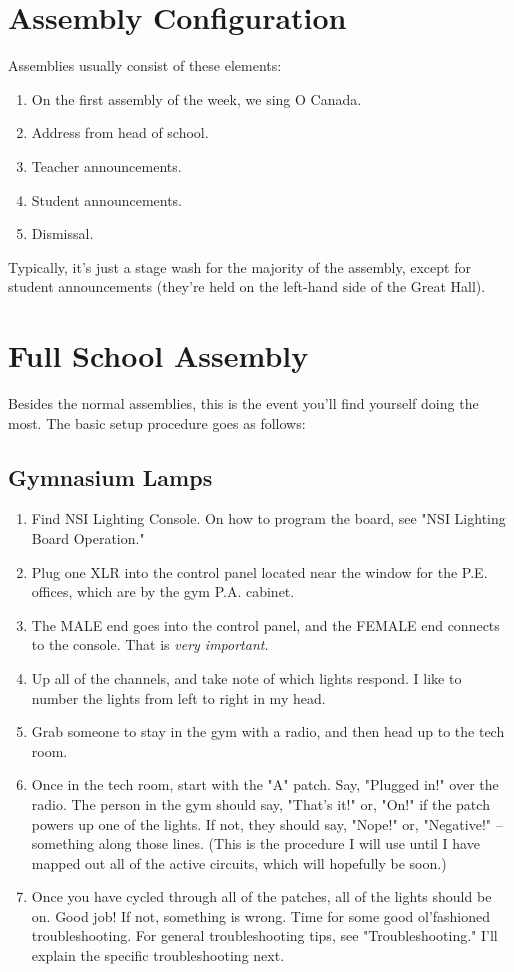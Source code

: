 \documentclass[letterpaper,10pt,oneside,headsepline]{scrreprt}
\begin{document}
\section{Assembly Configuration}
Assemblies usually consist of these elements:
\begin{enumerate}
\item On the first assembly of the week, we sing O Canada.
\item Address from head of school.
\item Teacher announcements.
\item Student announcements. 
\item Dismissal.
\end{enumerate} 
Typically, it's just a stage wash for the majority of the assembly, except for student announcements (they're held on the left-hand side of the Great Hall).

\section{Full School Assembly}
Besides the normal assemblies, this is the event you'll find yourself doing the most. The basic setup procedure goes as follows:
\subsection{Gymnasium Lamps}
\begin{enumerate}
\item Find NSI Lighting Console. On how to program the board, see "NSI Lighting Board Operation."
\item Plug one XLR into the control panel located near the window for the P.E. offices, which are by the gym P.A. cabinet.
\item The MALE end goes into the control panel, and the FEMALE end connects to the console. That is \textit{very important}.
\item Up all of the channels, and take note of which lights respond. I like to number the lights from left to right in my head.
\item Grab someone to stay in the gym with a radio, and then head up to the tech room.
\item Once in the tech room, start with the "A" patch. Say, "Plugged in!" over the radio. The person in the gym should say, "That's it!" or, "On!" if the patch powers up one of the lights. If not, they should say, "Nope!" or, "Negative!" -- something along those lines. (This is the procedure I will use until I have mapped out all of the active circuits, which will hopefully be soon.)
\item Once you have cycled through all of the patches, all of the lights should be on. Good job! If not, something is wrong. Time for some good ol'fashioned troubleshooting. For general troubleshooting tips, see "Troubleshooting." I'll explain the specific troubleshooting next.
\end{enumerate}
\end{document}
